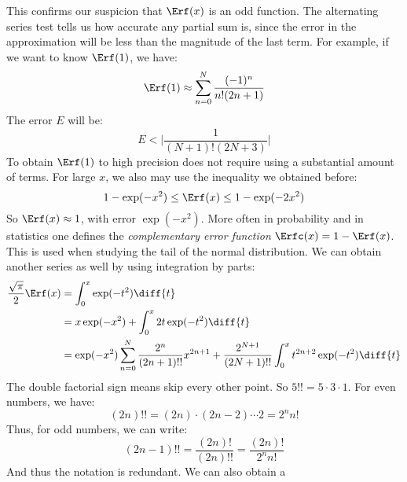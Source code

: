         This confirms our suspicion that $\Erf(x)$ is an
        odd function. The alternating series test tells us how
        accurate any partial sum is, since the error in the
        approximation will be less than the magnitude of the
        last term. For example, if we want to know $\Erf(1)$,
        we have:
        \begin{equation}
            \Erf(1)\approx
                \sum_{n=0}^{N}\frac{(-1)^{n}}{n!(2n+1)}
        \end{equation}
        The error $E$ will be:
        \begin{equation}
            E<\Big|\frac{1}{(N+1)!(2N+3)}\Big|
        \end{equation}
        To obtain $\Erf(1)$ to high precision does not require
        using a substantial amount of terms. For large $x$,
        we also may use the inequality we obtained before:
        \begin{equation}
            1-\exp(-x^{2})\leq\Erf(x)\leq1-\exp(-2x^{2})
        \end{equation}
        So $\Erf(x)\approx{1}$, with error $\exp(-x^{2})$.
        More often in probability and in statistics one defines
        the \textit{complementary error function}
        $\Erfc(x)=1-\Erf(x)$. This is used when studying the
        tail of the normal distribution. We can obtain another
        series as well by using integration by parts:
        \begin{align}
            \frac{\sqrt{\pi}}{2}\Erf(x)
            &=\int_{0}^{x}\exp(-t^{2})\diff{t}\\
            &=x\exp(-x^{2})+\int_{0}^{x}2t\exp(-t^{2})\diff{t}\\
            &=\exp(-x^{2})\sum_{n=0}^{N}
                \frac{2^{n}}{(2n+1)!!}x^{2n+1}
            +\frac{2^{N+1}}{(2N+1)!!}
            \int_{0}^{x}t^{2n+2}\exp(-t^{2})\diff{t}
        \end{align}
        The double factorial sign means skip every other point.
        So $5!!=5\cdot{3}\cdot{1}$. For even numbers, we have:
        \begin{equation}
            (2n)!!=(2n)\cdot(2n-2)\cdots{2}
            =2^{n}n!
        \end{equation}
        Thus, for odd numbers, we can write:
        \begin{equation}
            (2n-1)!!=\frac{(2n)!}{(2n)!!}
            =\frac{(2n)!}{2^{n}n!}
        \end{equation}
        And thus the notation is redundant. We can also obtain a
